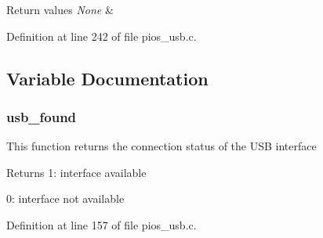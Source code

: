 \begin{DoxyRetVals}{Return values}
{\em None} & \\
\hline
\end{DoxyRetVals}


Definition at line 242 of file pios\-\_\-usb.\-c.



\subsection{Variable Documentation}
\hypertarget{group___p_i_o_s___u_s_b_ga2a91e3a5ac99b2ec7e0025c14ea0a34d}{
\subsubsection[{usb\-\_\-found}]{ usb\-\_\-found}}\label{group___p_i_o_s___u_s_b_ga2a91e3a5ac99b2ec7e0025c14ea0a34d}
This function returns the connection status of the U\-S\-B interface \begin{DoxyReturn}{Returns}
1\-: interface available 

0\-: interface not available 
\end{DoxyReturn}


Definition at line 157 of file pios\-\_\-usb.\-c.

